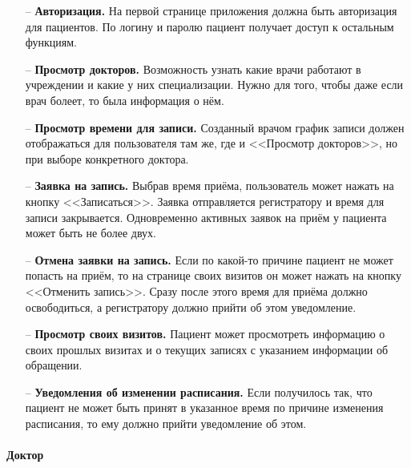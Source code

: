 \documentclass[a4paper,article]{article}
\begin{document}
\begin{sloppypar}
    \begin{itemize}[nolistsep]
        \item[--] \textbf{Авторизация.} На первой странице приложения должна быть авторизация для пациентов. По логину и паролю пациент получает доступ к остальным функциям.
        \item[--] \textbf{Просмотр докторов.} Возможность узнать какие врачи работают в учреждении и какие у них специализации. Нужно для того, чтобы даже если врач болеет, то была информация о нём.
        \item[--] \textbf{Просмотр времени для записи.} Созданный врачом график записи должен отображаться для пользователя там же, где и <<Просмотр докторов>>, но при выборе конкретного доктора.
        \item[--] \textbf{Заявка на запись.} Выбрав время приёма, пользователь может нажать на кнопку <<Записаться>>. Заявка отправляется регистратору и время для записи закрывается. Одновременно активных заявок на приём у пациента может быть не более двух.
        \item[--] \textbf{Отмена заявки на запись.} Если по какой-то причине пациент не может попасть на приём, то на странице своих визитов он может нажать на кнопку <<Отменить запись>>. Сразу после этого время для приёма должно освободиться, а регистратору должно прийти об этом уведомление.
        \item[--] \textbf{Просмотр своих визитов.} Пациент может просмотреть информацию о своих прошлых визитах и о текущих записях с указанием информации об обращении.
        \item[--] \textbf{Уведомления об изменении расписания.} Если получилось так, что пациент не может быть принят в указанное время по причине изменения расписания, то ему должно прийти уведомление об этом.
    \end{itemize}

    \paragraph{Доктор}\label{ТЗ. Доктор}


\end{sloppypar}
\end{document}

